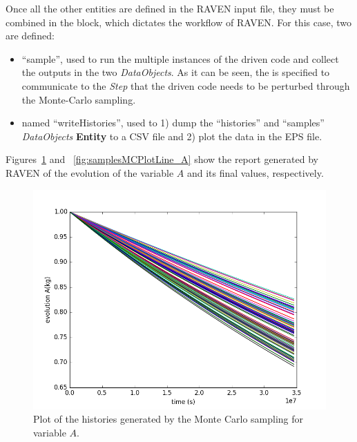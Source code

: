 Once all the other entities are defined in the RAVEN input file, they must be combined in the  block,
which dictates the workflow of RAVEN.  For this case, two  are defined:
\begin{itemize}
  \item {} ``sample'', used to run the multiple instances of the driven code and  collect the outputs
    in the two \textit{DataObjects}. As it can be seen, the  is specified to communicate to the
    \textit{Step} that the driven code needs to be perturbed through the Monte-Carlo sampling.
  \item  {} named ``writeHistories'', used to 1) dump the ``histories'' and ``samples'' \textit{DataObjects}
    \textbf{Entity} to a CSV file and 2) plot the data in the EPS file.
\end{itemize}

Figures~\ref{fig:historiesMCPlotLine_A} and ~\ref{fig:samplesMCPlotLine_A} show the report generated by RAVEN of the
evolution of the variable $A$ and its final values, respectively.

\begin{figure}[h!]
  \centering
  \includegraphics[scale=0.7]{../../tests/framework/user_guide/ravenTutorial/gold/MonteCarlo/1-history_A_line.png}
  \caption{Plot of the histories generated by the Monte Carlo sampling for variable $A$.}
  \label{fig:historiesMCPlotLine_A}
\end{figure}
 
